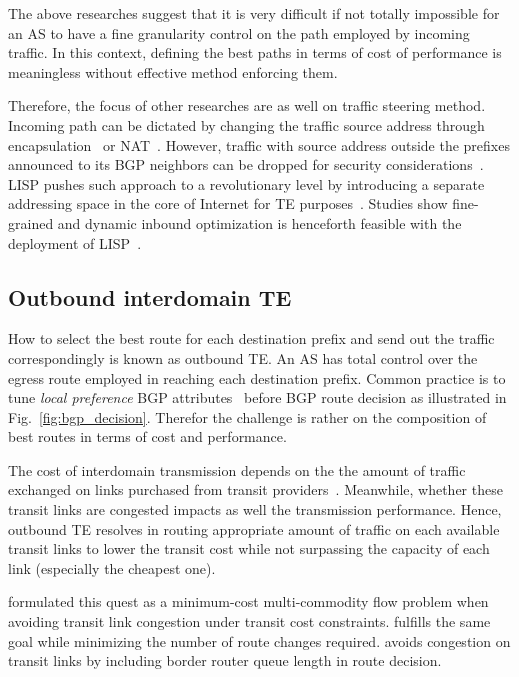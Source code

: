 The above researches suggest that it is very difficult if not totally impossible for an AS to have a fine granularity control on the path employed by incoming traffic. In this context, defining the best paths in terms of cost of performance is meaningless without effective method enforcing them. 

Therefore, the focus of other researches are as well on traffic steering method.
Incoming path can be dictated by changing the traffic source address through encapsulation~\cite{Liu2008} or \ac{NAT}~\cite{Sun2015}. However, traffic with source address outside the prefixes announced to its BGP neighbors can be dropped for security considerations~\cite{filtering}.
\ac{LISP} pushes such approach to a revolutionary level by introducing a separate addressing space in the core of Internet for TE purposes~\cite{lisp}. Studies show fine-grained and dynamic inbound optimization is henceforth feasible with the deployment of \ac{LISP}~\cite{Iannone2007, saucez2011mechanisms, quoitin2007evaluating}.


\subsection{Outbound interdomain TE}
How to select the best route for each destination prefix and send out the traffic correspondingly is known as outbound TE. 
An AS has total control over the egress route employed in reaching each destination prefix. Common practice is to tune \textit{local preference} BGP attributes~\cite{Wang2008} before BGP route decision as illustrated in Fig.~\ref{fig:bgp_decision}. 
Therefor the challenge is rather on the composition of best routes in terms of cost and performance.

The cost of interdomain transmission depends on the the amount of traffic exchanged on links purchased from transit providers~\cite{drpeering-95th}.
Meanwhile, whether these transit links are congested impacts as well the transmission performance.
Hence, outbound TE resolves in routing appropriate amount of traffic on each available transit links to lower the transit cost while not surpassing the capacity of each link (especially the cheapest one).

\citet{Goldenberg2004} formulated this quest as a minimum-cost multi-commodity flow problem when avoiding transit link congestion under transit cost constraints.
\citet{Uhlig2004b} fulfills the same goal while minimizing the number of route changes required.
\citet{Zhu2014} avoids congestion on transit links by including border router queue length in route decision.

